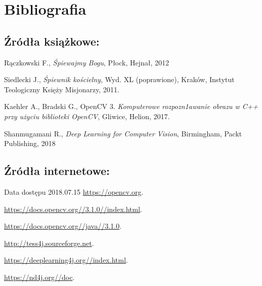 \documentclass[a4paper,12pt]{article}
\begin{document}
	   
	   
	   \newpage

        \section{Bibliografia}
        \begin{thebibliography}{99}
            \subsection{Źródła książkowe:}
            Rączkowski F., \textit{Śpiewajmy Bogu}, Płock, Hejnał, 2012
 
            Siedlecki J., \textit{Śpiewnik kościelny}, Wyd. XL (poprawione), Kraków,
            Instytut Teologiczny Księży Misjonarzy, 2011.
        
            Kaehler A., Bradski G., OpenCV 3. \textit{Komputerowe rozpozn1awanie obrazu w C++ przy użyciu biblioteki OpenCV}, Gliwice, Helion, 2017.
            
            Shanmugamani R., \textit{Deep Learning for Computer Vision}, Birmingham, Packt Publishing, 2018

            \subsection{Źródła internetowe:}
            Data dostępu 2018.07.15
            \href{https://opencv.org}{\url{https://opencv.org}}.
            
            \href{https://docs.opencv.org//3.1.0//index.html}{\url{https://docs.opencv.org//3.1.0//index.html}}.
            
            \href{https://docs.opencv.org//java//3.1.0}{\url{https://docs.opencv.org//java//3.1.0}}.
            
            \href{http://tess4j.sourceforge.net}{\url{http://tess4j.sourceforge.net}}.
            
            \href{https://deeplearning4j.org//index.html}{\url{https://deeplearning4j.org//index.html}}.
            
            \href{https://nd4j.org//doc}{\url{https://nd4j.org//doc}}.
            

\end{thebibliography}
\end{document}
